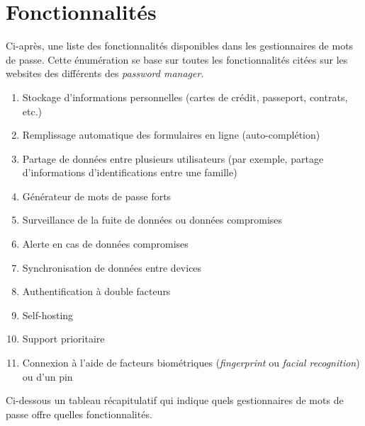 \section{Fonctionnalités}
Ci-après, une liste des fonctionnalités disponibles dans les gestionnaires de mots de passe. Cette énumération se base sur toutes les fonctionnalités citées sur les websites des différents des \textit{password manager}. \\
\begin{enumerate}
	\item Stockage d'informations personnelles (cartes de crédit, passeport, contrats, etc.)
	\item Remplissage automatique des formulaires en ligne (auto-complétion)
	\item Partage de données entre plusieurs utilisateurs (par exemple, partage d'informations d'identifications entre une famille)
	\item Générateur de mots de passe forts
	\item Surveillance de la fuite de données ou données compromises
	\item Alerte en cas de données compromises
	\item Synchronisation de données entre devices
	\item Authentification à double facteurs
	\item Self-hosting
	\item Support prioritaire
	\item Connexion à l'aide de facteurs biométriques (\textit{fingerprint} ou \textit{facial recognition}) ou d'un pin
	
\end{enumerate}
Ci-dessous un tableau récapitulatif qui indique quels gestionnaires de mots de passe offre quelles fonctionnalités. 
